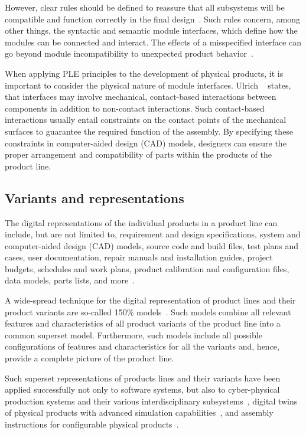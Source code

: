 \documentclass[sigconf,review,anonymous]{acmart}
\begin{document}
However, clear rules should be defined to reassure that all subsystems will be compatible and function correctly in the final design~\cite{Baldwin_2003}.
Such rules concern, among other things, the syntactic and semantic module interfaces, which define how the modules can be connected and interact.
The effects of a misspecified interface can go beyond module incompatibility to unexpected product behavior~\cite{Parslov_2015}. 

When applying PLE principles to the development of physical products, it is important to consider the physical nature of module interfaces.
Ulrich ~\cite{Ulrich_1995} states, that interfaces may involve mechanical, contact-based interactions between components in addition to non-contact interactions.
Such contact-based interactions usually entail constraints on the contact points of the mechanical surfaces to guarantee the required function of the assembly.
By specifying these constraints in computer-aided design (CAD) models, designers can ensure the proper arrangement and compatibility of parts within the products of the product line.

\subsection{Variants and representations}
\label{sec:variants}

The digital representations of the individual products in a product line can include, but are not limited to, requirement and design specifications, system and computer-aided design (CAD) models, source code and build files, test plans and cases, user documentation, repair manuals and installation guides, project budgets, schedules and work plans, product calibration and configuration files, data models, parts lists, and more~\cite{Clements_2015}. 

A wide-spread technique for the digital representation of product lines and their product variants are so-called 150\% models~\cite{Clements_2015}.
Such models combine all relevant features and characteristics of all product variants of the product line into a common superset model.
Furthermore, such models include all possible configurations of features and characteristics for all the variants and, hence, provide a complete picture of the product line.

Such superset representations of products lines and their variants have been applied successfully not only to software systems, but also to cyber-physical production systems and their various interdisciplinary subsystems~\cite{Fadhlillah_2023}, digital twins of physical products with advanced simulation capabilities~\cite{Wagner_2024}, and assembly instructions for configurable physical products~\cite{Zogopoulos_2024}.
\end{document}
